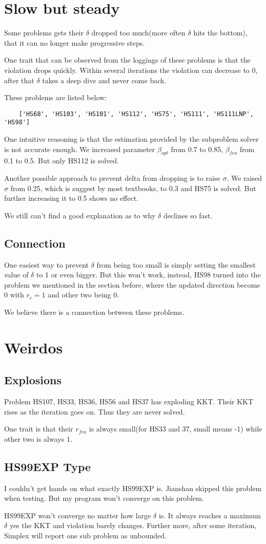 \documentclass[10pt]{article}
\begin{document}
\section{Slow but steady}\par
	Some problems gets their $\delta$ dropped too much(more often $\delta$ hits the bottom), that it can no longer make progressive steps. \par
	One trait that can be observed from the loggings of these problems is that the violation drops quickly. Within several iterations the violation can decrease to 0, after that $\delta$ takes a deep dive and never come back. \par
	These problems are listed below:
	\begin{lstlisting}
	['HS68', 'HS103', 'HS101', 'HS112', 'HS75', 'HS111', 'HS111LNP', 'HS98']
	\end{lstlisting}
	One intuitive reasoning is that the estimation provided by the subproblem solver is not accurate enough. We increased parameter $\beta_{opt}$ from 0.7 to 0.85, $\beta_{fea}$ from 0.1 to 0.5. But only HS112 is solved. \par
	Another possible approach to prevent delta from dropping is to raise $\sigma$. We raised $\sigma$ from 0.25, which is suggest by most textbooks, to 0.3 and HS75 is solved. But further increasing it to 0.5 shows no effect. \par
	We still can't find a good explanation as to why $\delta$ declines so fast.
	\subsection{Connection}
		One easiest way to prevent $\delta$ from being too small is simply setting the smallest value of $\delta$ to 1 or even bigger. But this won't work, instead, HS98 turned into the problem we mentioned in the section before, where the updated direction become 0 with $r_c = 1$ and other two being 0.
		\par We believe there is a connection between these problems.

\section{Weirdos}
	\subsection{Explosions}
		Problem HS107, HS33, HS36, HS56 and HS37 has exploding KKT. Their KKT rises as the iteration goes on. Thus they are never solved. \par
		One trait is that their $r_{fea}$ is always small(for HS33 and 37, small means -1) while other two is always 1.
	\subsection{HS99EXP Type}
		I couldn't get hands on what exactly HS99EXP is. Jianshan skipped this problem when testing. But my program won't converge on this problem. \par
		HS99EXP won't converge no matter how large $\delta$ is. It always reaches a maximum $\delta$ yes the KKT and violation barely changes. Further more, after some iteration, Simplex will report one sub problem as unbounded.
\end{document}
